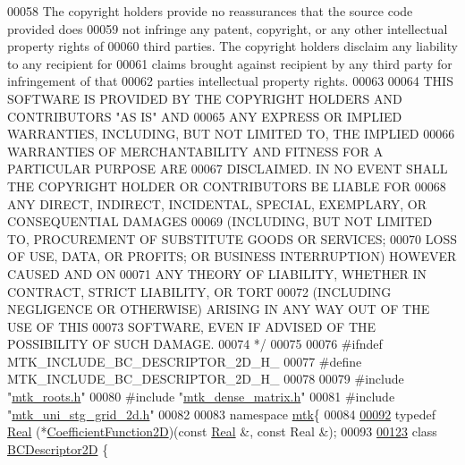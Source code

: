 \begin{DoxyCode}
00058 \textcolor{comment}{The copyright holders provide no reassurances that the source code provided does}
00059 \textcolor{comment}{not infringe any patent, copyright, or any other intellectual property rights of}
00060 \textcolor{comment}{third parties. The copyright holders disclaim any liability to any recipient for}
00061 \textcolor{comment}{claims brought against recipient by any third party for infringement of that}
00062 \textcolor{comment}{parties intellectual property rights.}
00063 \textcolor{comment}{}
00064 \textcolor{comment}{THIS SOFTWARE IS PROVIDED BY THE COPYRIGHT HOLDERS AND CONTRIBUTORS "AS IS" AND}
00065 \textcolor{comment}{ANY EXPRESS OR IMPLIED WARRANTIES, INCLUDING, BUT NOT LIMITED TO, THE IMPLIED}
00066 \textcolor{comment}{WARRANTIES OF MERCHANTABILITY AND FITNESS FOR A PARTICULAR PURPOSE ARE}
00067 \textcolor{comment}{DISCLAIMED. IN NO EVENT SHALL THE COPYRIGHT HOLDER OR CONTRIBUTORS BE LIABLE FOR}
00068 \textcolor{comment}{ANY DIRECT, INDIRECT, INCIDENTAL, SPECIAL, EXEMPLARY, OR CONSEQUENTIAL DAMAGES}
00069 \textcolor{comment}{(INCLUDING, BUT NOT LIMITED TO, PROCUREMENT OF SUBSTITUTE GOODS OR SERVICES;}
00070 \textcolor{comment}{LOSS OF USE, DATA, OR PROFITS; OR BUSINESS INTERRUPTION) HOWEVER CAUSED AND ON}
00071 \textcolor{comment}{ANY THEORY OF LIABILITY, WHETHER IN CONTRACT, STRICT LIABILITY, OR TORT}
00072 \textcolor{comment}{(INCLUDING NEGLIGENCE OR OTHERWISE) ARISING IN ANY WAY OUT OF THE USE OF THIS}
00073 \textcolor{comment}{SOFTWARE, EVEN IF ADVISED OF THE POSSIBILITY OF SUCH DAMAGE.}
00074 \textcolor{comment}{*/}
00075 
00076 \textcolor{preprocessor}{#ifndef MTK\_INCLUDE\_BC\_DESCRIPTOR\_2D\_H\_}
00077 \textcolor{preprocessor}{#define MTK\_INCLUDE\_BC\_DESCRIPTOR\_2D\_H\_}
00078 
00079 \textcolor{preprocessor}{#include "\hyperlink{mtk__roots_8h}{mtk\_roots.h}"}
00080 \textcolor{preprocessor}{#include "\hyperlink{mtk__dense__matrix_8h}{mtk\_dense\_matrix.h}"}
00081 \textcolor{preprocessor}{#include "\hyperlink{mtk__uni__stg__grid__2d_8h}{mtk\_uni\_stg\_grid\_2d.h}"}
00082 
00083 \textcolor{keyword}{namespace }\hyperlink{namespacemtk}{mtk}\{
00084 
\hypertarget{mtk__bc__descriptor__2d_8h_source_l00092}{}\hyperlink{group__c07-mim__ops_gad9e1c0ace886b0029aefffa5f320e852}{00092} \textcolor{keyword}{typedef} \hyperlink{group__c01-roots_gac080bbbf5cbb5502c9f00405f894857d}{Real} (*\hyperlink{group__c07-mim__ops_gad9e1c0ace886b0029aefffa5f320e852}{CoefficientFunction2D})(\textcolor{keyword}{const} \hyperlink{group__c01-roots_gac080bbbf5cbb5502c9f00405f894857d}{Real} &, \textcolor{keyword}{const} Real &);
00093 
\hypertarget{mtk__bc__descriptor__2d_8h_source_l00123}{}\hyperlink{classmtk_1_1BCDescriptor2D}{00123} \textcolor{keyword}{class }\hyperlink{classmtk_1_1BCDescriptor2D}{BCDescriptor2D} \{

\end{DoxyCode}
